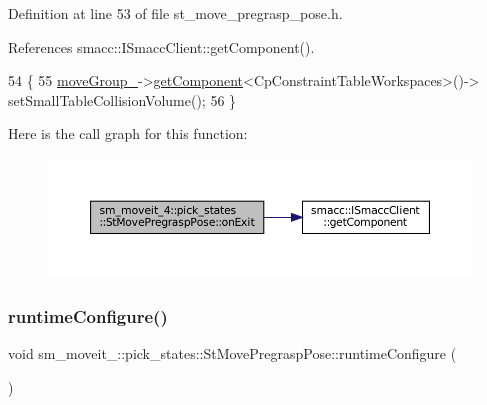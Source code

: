 Definition at line 53 of file st\+\_\+move\+\_\+pregrasp\+\_\+pose.\+h.



References smacc\+::\+I\+Smacc\+Client\+::get\+Component().


\begin{DoxyCode}
54             \{
55                 \hyperlink{structsm__moveit__4_1_1pick__states_1_1StMovePregraspPose_a7ac8229ab37dba1b2eb43668e4adceea}{moveGroup\_}->\hyperlink{classsmacc_1_1ISmaccClient_adef78db601749ca63c19e74a27cb88cc}{getComponent}<CpConstraintTableWorkspaces>()->
      setSmallTableCollisionVolume();
56             \}
\end{DoxyCode}
Here is the call graph for this function\+:
\nopagebreak
\begin{figure}[H]
\begin{center}
\leavevmode
\includegraphics[width=350pt]{structsm__moveit__4_1_1pick__states_1_1StMovePregraspPose_ae2f50199e1766c1bcdb8fcd25e9a0e16_cgraph}
\end{center}
\end{figure}
\mbox{\label{structsm__moveit__4_1_1pick__states_1_1StMovePregraspPose_ae9ffdf77d89169b5f4fb2cb2fadd56fc}} 
\subsubsection{\texorpdfstring{runtime\+Configure()}{runtimeConfigure()}}
{\footnotesize\ttfamily void sm\+\_\+moveit\+\_\+::pick\+\_\+states\+::\+St\+Move\+Pregrasp\+Pose\+::runtime\+Configure (\begin{DoxyParamCaption}{ }\end{DoxyParamCaption})\hspace{0.3cm}{\ttfamily [inline]}}



